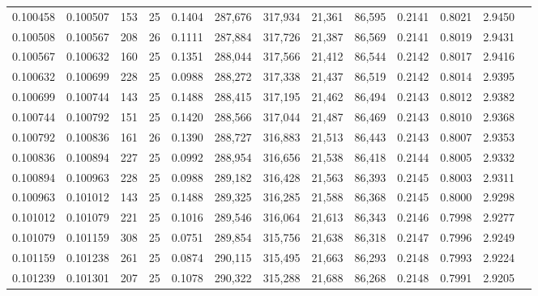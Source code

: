 \begin{tabular}{rrrrrrrrrrrrr}
0.100458 & 0.100507 &   153 &  25 &                                     0.1404 & 287,676 & 317,934 &  21,361 &  86,595 & 0.2141 & 0.8021 & 2.9450 \\
0.100508 & 0.100567 &   208 &  26 &                                     0.1111 & 287,884 & 317,726 &  21,387 &  86,569 & 0.2141 & 0.8019 & 2.9431 \\
0.100567 & 0.100632 &   160 &  25 &                                     0.1351 & 288,044 & 317,566 &  21,412 &  86,544 & 0.2142 & 0.8017 & 2.9416 \\
0.100632 & 0.100699 &   228 &  25 &                                     0.0988 & 288,272 & 317,338 &  21,437 &  86,519 & 0.2142 & 0.8014 & 2.9395 \\
0.100699 & 0.100744 &   143 &  25 &                                     0.1488 & 288,415 & 317,195 &  21,462 &  86,494 & 0.2143 & 0.8012 & 2.9382 \\
0.100744 & 0.100792 &   151 &  25 &                                     0.1420 & 288,566 & 317,044 &  21,487 &  86,469 & 0.2143 & 0.8010 & 2.9368 \\
0.100792 & 0.100836 &   161 &  26 &                                     0.1390 & 288,727 & 316,883 &  21,513 &  86,443 & 0.2143 & 0.8007 & 2.9353 \\
0.100836 & 0.100894 &   227 &  25 &                                     0.0992 & 288,954 & 316,656 &  21,538 &  86,418 & 0.2144 & 0.8005 & 2.9332 \\
0.100894 & 0.100963 &   228 &  25 &                                     0.0988 & 289,182 & 316,428 &  21,563 &  86,393 & 0.2145 & 0.8003 & 2.9311 \\
0.100963 & 0.101012 &   143 &  25 &                                     0.1488 & 289,325 & 316,285 &  21,588 &  86,368 & 0.2145 & 0.8000 & 2.9298 \\
0.101012 & 0.101079 &   221 &  25 &                                     0.1016 & 289,546 & 316,064 &  21,613 &  86,343 & 0.2146 & 0.7998 & 2.9277 \\
0.101079 & 0.101159 &   308 &  25 &                                     0.0751 & 289,854 & 315,756 &  21,638 &  86,318 & 0.2147 & 0.7996 & 2.9249 \\
0.101159 & 0.101238 &   261 &  25 &                                     0.0874 & 290,115 & 315,495 &  21,663 &  86,293 & 0.2148 & 0.7993 & 2.9224 \\
0.101239 & 0.101301 &   207 &  25 &                                     0.1078 & 290,322 & 315,288 &  21,688 &  86,268 & 0.2148 & 0.7991 & 2.9205 \\

\end{tabular}
